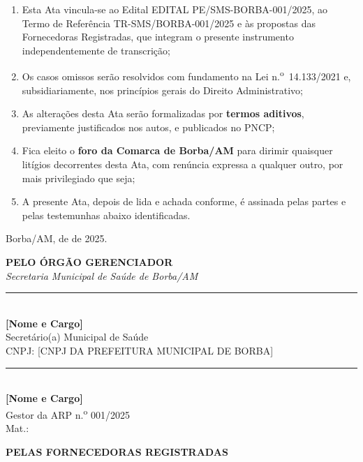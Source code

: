 \documentclass[12pt,a4paper]{article}
\newcommand{\blank}[1]{\underline{\hspace{#1}}}
\newcommand{\assinatura}[3]{%
  \begin{center}\vspace{0.3cm}
  \rule{7.5cm}{0.5pt}\\[3pt]
  \textbf{#1}\\\small #2\\\small #3
  \end{center}}
\newcommand{\arpNum}{001}          %
\newcommand{\exercicio}{2025}
\newcommand{\editalRef}{EDITAL PE/SMS-BORBA-001/2025}
\newcommand{\trRef}{TR-SMS/BORBA-001/2025}
\newcommand{\munCNPJ}{[CNPJ DA PREFEITURA MUNICIPAL DE BORBA]}
\begin{document}
\begin{enumerate}
  \item Esta Ata vincula-se ao Edital \editalRef, ao Termo de Referência \trRef
    e às propostas das Fornecedoras Registradas, que integram o presente instrumento
    independentemente de transcrição;

  \item Os casos omissos serão resolvidos com fundamento na Lei
    n.\textsuperscript{o}~14.133/2021 e, subsidiariamente, nos princípios gerais
    do Direito Administrativo;

  \item As alterações desta Ata serão formalizadas por \textbf{termos aditivos},
    previamente justificados nos autos, e publicados no PNCP;

  \item Fica eleito o \textbf{foro da Comarca de Borba/AM} para dirimir quaisquer
    litígios decorrentes desta Ata, com renúncia expressa a qualquer outro, por
    mais privilegiado que seja;

  \item A presente Ata, depois de lida e achada conforme, é assinada pelas
    partes e pelas testemunhas abaixo identificadas.
\end{enumerate}

\vspace{0.8cm}
\noindent\hfill Borba/AM, \blank{0.8cm} de \blank{2.5cm} de \exercicio.

\vspace{1.0cm}
\begin{center}
  \textbf{\color{navy}\large PELO ÓRGÃO GERENCIADOR}\\[0.2cm]
  \textit{\small Secretaria Municipal de Saúde de Borba/AM}
\end{center}

\vspace{0.6cm}
\begin{minipage}{0.47\linewidth}
\assinatura{[Nome e Cargo]}{Secretário(a) Municipal de Saúde}{CNPJ: \munCNPJ}
\end{minipage}
\hfill
\begin{minipage}{0.47\linewidth}
\assinatura{[Nome e Cargo]}{Gestor da ARP n.\textsuperscript{o} \arpNum/\exercicio}{Mat.: \blank{2cm}}
\end{minipage}

\vspace{1.0cm}
\begin{center}
  \textbf{\color{navy}\large PELAS FORNECEDORAS REGISTRADAS}
\end{center}
\end{document}
